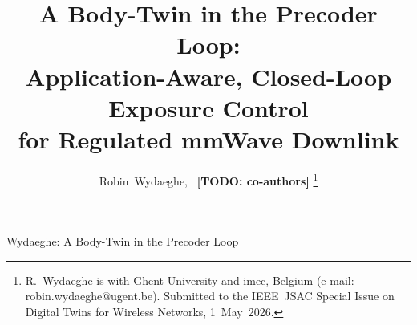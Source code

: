 \documentclass[journal,twocolumn,10pt]{IEEEtran}
\theoremstyle{definition}
\newcommand{\TODO}[1]{\textcolor{red!80!black}{\textbf{[TODO: #1]}}}
\begin{document}
\title{A Body-Twin in the Precoder Loop: \\
       Application-Aware, Closed-Loop Exposure Control \\
       for Regulated mmWave Downlink}

\author{Robin~Wydaeghe,~
        \TODO{co-authors}%
\thanks{R.~Wydaeghe is with Ghent University and imec, Belgium
        (e-mail: robin.wydaeghe@ugent.be). Submitted to the
        IEEE~JSAC Special Issue on Digital Twins for Wireless
        Networks, 1~May~2026.}}

%
{Wydaeghe: A Body-Twin in the Precoder Loop}

\maketitle
\end{document}
